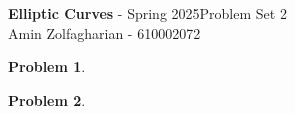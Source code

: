 \documentclass[12pt]{article}
\newcommand{\customanswer}[1]{%
\begin{problem}
\end{problem}

}
\newtheorem{problem}{Problem}
\begin{document}
\noindent \textbf{Elliptic Curves} - Spring 2025\hfill Problem Set 2\\
Amin Zolfagharian - 610002072

\hrulefill

\customanswer{1}
\customanswer{2}
\end{document}
